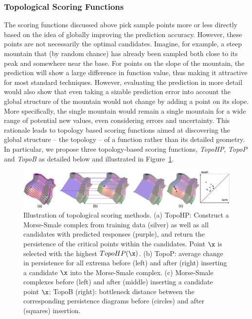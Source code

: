 \subsubsection{Topological Scoring Functions}
\label{sec:toposcoring}
The scoring functions discussed above pick sample points more or less directly based on the idea of globally improving the prediction accuracy.
%
However, these points are not necessarily the optimal candidates.
%
Imagine, for example, a steep mountain that (by random chance) has already been sampled both close to its peak and somewhere near the base.
%
For points on the slope of the mountain, the prediction will show a large difference in function value, thus making it attractive for most standard techniques.
%
However, evaluating the prediction in more detail would also show that even taking a sizable prediction error into account the global structure of the mountain would not change by adding a point on its slope.
%
More specifically, the single mountain would remain a single mountain for a wide range of potential new values, even considering errors and uncertainty.
%
This rationale leads to topology based scoring functions aimed at discovering the global structure -- the topology -- of a function rather than its detailed geometry.
%
In particular, we propose three topology-based scoring functions, \emph{TopoHP}, \emph{TopoP} and \emph{TopoB} as detailed below and illustrated in Figure~\ref{fig:topo-all}.

\begin{figure}[!t]
  \begin{center}
  \includegraphics[width=1.0\linewidth]{figs/chap5/topo-all}
  \caption[Illustration of topological scoring methods]{Illustration of topological scoring methods. (a) TopoHP: Construct a Morse-Smale complex from training data (silver) as well as all candidates with predicted responses (purple), and return the persistence of the critical points within the candidates.
  Point $\protect\x$ is selected with the highest $TopoHP(\protect\x)$.
  (b) TopoP: average change in persistence for all extrema before (left) and after (right) inserting a candidate $\protect\x$ into the Morse-Smale complex.
  (c) Morse-Smale complexes before (left) and after (middle) inserting a candidate point $\protect\x$;
  TopoB (right): bottleneck distance between the corresponding persistence diagrams before (circles) and after (squares) insertion.}
  \label{fig:topo-all}
  \end{center}
\end{figure}


